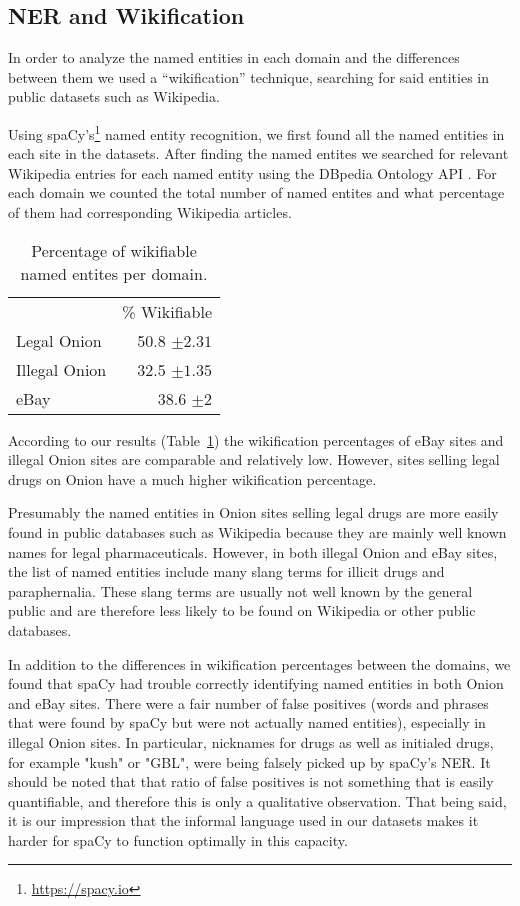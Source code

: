 \documentclass[11pt,a4paper,table]{article}
\begin{document}
\subsection{NER and Wikification}

In order to analyze the named entities in each domain and the differences
between them we used a ``wikification'' technique, searching for
said entities in public datasets such as Wikipedia. 

Using spaCy's\footnote{\url{https://spacy.io}}
named entity recognition, we first found all the named
entities in each site in the datasets. After finding the named entites
we searched for relevant Wikipedia entries for each named entity using
the DBpedia Ontology API \cite{isem2013daiber}.
For each domain we counted the total number
of named entites and what percentage of them had corresponding Wikipedia
articles.

\begin{table}
\begin{center}
\begin{tabular}{lr}
 & \% Wikifiable\\
Legal Onion & 50.8 $\pm2.31$\\
Illegal Onion & 32.5 $\pm1.35$\\
eBay & 38.6 $\pm2$\\
\end{tabular}
\end{center}
\caption{Percentage of wikifiable named entites per domain.\label{ta:wiki}}
\end{table}
According to our results (Table~\ref{ta:wiki}) the wikification percentages of
eBay sites and illegal Onion sites are comparable and relatively low.
However, sites selling legal drugs on Onion have a much higher wikification
percentage.

Presumably the named entities in Onion sites selling legal drugs are
more easily found in public databases such as Wikipedia because they
are mainly well known names for legal pharmaceuticals. However, in
both illegal Onion and eBay sites, the list of named entities include
many slang terms for illicit drugs and paraphernalia. These slang terms
are usually not well known by the general public and are therefore
less likely to be found on Wikipedia or other public databases.

In addition to the differences in wikification percentages between
the domains, we found that spaCy had trouble correctly identifying
named entities in both Onion and eBay sites. There were a fair number
of false positives (words and phrases that were found by spaCy but
were not actually named entities),
especially in illegal Onion sites. In particular, nicknames for drugs as well as initialed drugs, for example "kush" or "GBL", were being falsely picked up by spaCy's NER.
It should be noted that that ratio of false positives is not something that is easily quantifiable, and therefore this is only a qualitative observation. That being said, it is our impression that the informal language used in our datasets makes it harder
for spaCy to function optimally in this capacity.
\end{document}
